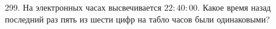299. На электронных часах высвечивается $22:40:00.$ Какое время назад последний раз пять из шести цифр на табло часов были одинаковыми?\\
